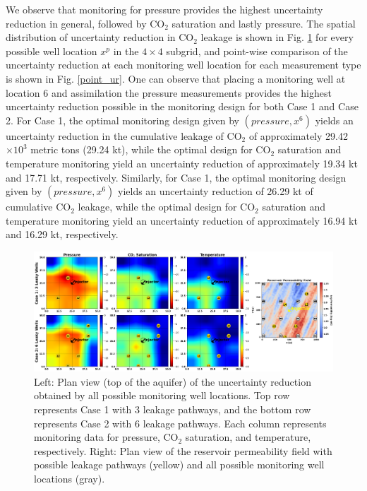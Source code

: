 \documentclass[10pt, twoside]{article}
\begin{document}
We observe that monitoring for pressure provides the highest uncertainty reduction in general, followed by CO$_2$ saturation and lastly pressure. The spatial distribution of uncertainty reduction in CO$_2$ leakage is shown in Fig. \ref{heatmaps} for every possible well location $x^p$ in the $4 \times 4$ subgrid, and point-wise comparison of the uncertainty reduction at each monitoring well location for each measurement type is shown in Fig. \ref{point_ur}. One can observe that placing a monitoring well at location 6 and assimilation the pressure measurements provides the highest uncertainty reduction possible in the monitoring design for both Case 1 and Case 2. For Case 1, the optimal monitoring design given by $(pressure, x^6)$ yields an uncertainty reduction in the cumulative leakage of CO$_2$ of approximately 29.42$\times 10^3$ metric tons (29.24 kt), while the optimal design for CO$_2$ saturation and temperature monitoring yield an uncertainty reduction of approximately 19.34 kt and 17.71 kt, respectively. Similarly, for Case 1, the optimal monitoring design given by $(pressure, x^6)$ yields an uncertainty reduction of 26.29 kt of cumulative CO$_2$ leakage, while the optimal design for CO$_2$ saturation and temperature monitoring yield an uncertainty reduction of approximately 16.94 kt and 16.29 kt, respectively.

\begin{figure} [H]
\centering
\includegraphics[width=16.5 cm]{Figure 10.png}
\caption{Left: Plan view (top of the aquifer) of the uncertainty reduction obtained by all possible monitoring well locations. Top row represents Case 1 with 3 leakage pathways, and the bottom row represents Case 2 with 6 leakage pathways. Each column represents monitoring data for pressure, CO$_2$ saturation, and temperature, respectively. Right: Plan view of the reservoir permeability field with possible leakage pathways (yellow) and all possible monitoring well locations (gray).}
\label{heatmaps}
\end{figure}
\end{document}
